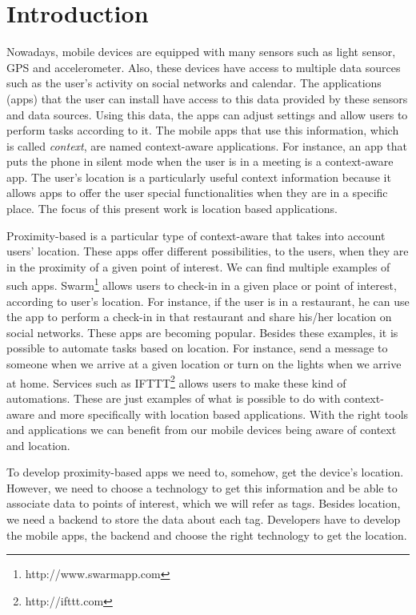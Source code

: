 
\section{Introduction}
\label{sec:introduction}
Nowadays, mobile devices are equipped with many sensors such as light sensor, \gls{GPS} and accelerometer.
Also, these devices have access to multiple data sources such as
the user's activity on social networks and calendar.
The applications (apps) that the user can install have access to this data provided by these sensors and data sources.
Using this data, the apps can adjust settings and allow users to perform tasks according to it.
The mobile apps that use this information, which is called \emph{context}, are named context-aware applications.
For instance, an app that puts the phone in silent mode when the user is in a meeting is a context-aware app.
The user's location is a particularly useful context information because it allows apps to offer the user special functionalities when they are in a specific place.
The focus of this present work is location based applications.

Proximity-based is a particular type of context-aware that takes into account users' location.
These apps offer different possibilities, to the users, when they are in the proximity of a given point of interest.
We can find multiple examples of such apps.
Swarm\footnote{http://www.swarmapp.com} allows users to check-in in a given place or point of interest, according to user's location.
For instance, if the user is in a restaurant, he can use the app to perform a check-in in that restaurant and share his/her location on social networks.
These apps are becoming popular.
Besides these examples, it is possible to automate tasks based on location.
For instance, send a message to someone when we arrive at a given location or turn on the lights when we arrive at home.
Services such as \gls{IFTTT}\footnote{http://ifttt.com} allows users to make these kind of automations.
These are just examples of what is possible to do with context-aware and more specifically with location based applications.
With the right tools and applications we can benefit from our mobile devices being aware of context and location.

To develop proximity-based apps we need to, somehow, get the device's location.
However, we need to choose a technology to get this information and be able to associate data to points of interest, which we will refer as tags.
Besides location, we need a backend to store the data about each tag.
Developers have to develop the mobile apps, the backend and choose the right technology to get the location.

